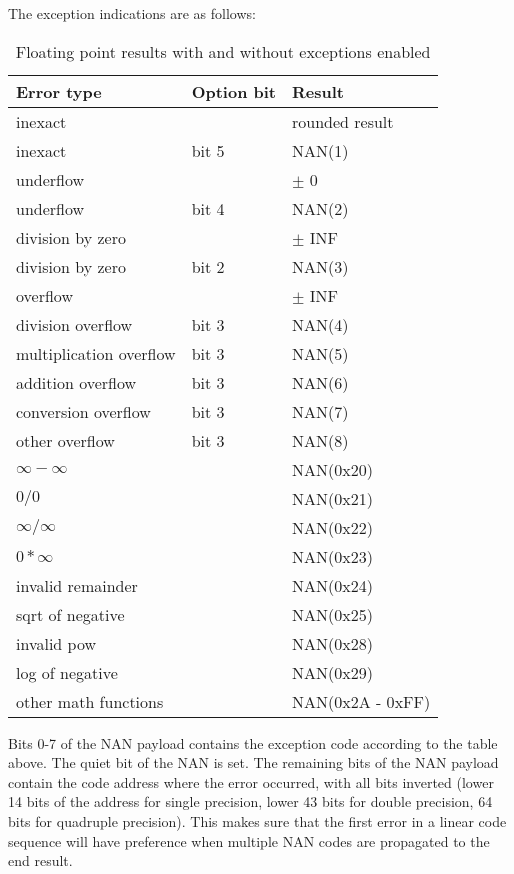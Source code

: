 \documentclass[forwardcom.tex]{subfiles}
\begin{document}
The exception indications are as follows:

\begin{longtable}
{|p{55mm}|p{20mm}|p{50mm}|}
\caption{Floating point results with and without exceptions enabled}
\label{table:FPExceptionResults}
\endfirsthead
\endhead
\hline
\bfseries Error type & \bfseries Option bit & \bfseries Result \\ \hline
inexact & & rounded result \\
inexact & bit 5 & NAN(1) \\
underflow & & $\pm$ 0 \\
underflow & bit 4 & NAN(2) \\
division by zero &  & $\pm$ INF \\
division by zero & bit 2 & NAN(3) \\
overflow & & $\pm$ INF \\
division overflow & bit 3 & NAN(4) \\
multiplication overflow & bit 3 & NAN(5) \\
addition overflow & bit 3 & NAN(6) \\
conversion overflow & bit 3 & NAN(7) \\
other overflow & bit 3 & NAN(8) \\
$\infty - \infty$ &  & NAN(0x20) \\
$0 / 0$  &  & NAN(0x21) \\
$\infty / \infty$ &  & NAN(0x22) \\ 
$0 * \infty$ &  & NAN(0x23) \\ 
invalid remainder & & NAN(0x24) \\
sqrt of negative & & NAN(0x25) \\
invalid pow & & NAN(0x28) \\
log of negative & & NAN(0x29) \\
other math functions & & NAN(0x2A - 0xFF) \\
\hline
\end{longtable}

Bits 0-7 of the NAN payload contains the exception code according to the table above. 
The quiet bit of the NAN is set. The remaining bits of the NAN payload contain the code address where the error occurred, with all bits inverted (lower 14 bits of the address for single precision, lower 43 bits for double precision, 64 bits for quadruple precision). This makes sure that the first error in a linear code sequence will have preference when multiple NAN codes are propagated to the end result.
\vv
\end{document}

